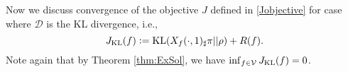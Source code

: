   

Now we discuss convergence of the objective $J$ defined in \eqref{Jobjective} for case where $\mathcal{D}$ is the KL divergence, i.e., 
  \begin{equation*}
    J_{\rm KL}(f) := {\rm KL}( X_f(\cdot,1)_\sharp \pi \vert \vert \rho ) + R(f).
  \end{equation*}
Note again that by Theorem \ref{thm:ExSol}, we have $\inf_{f\in\mathcal{V}} J_{\rm KL}(f)=0$. 
  
